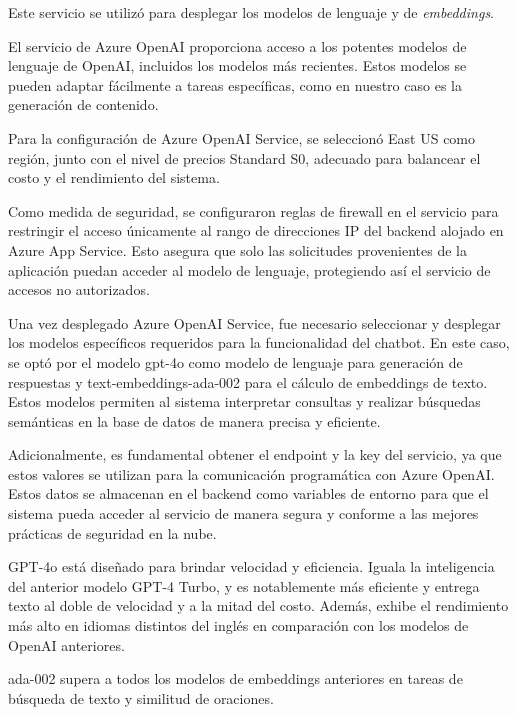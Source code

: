 Este servicio se utilizó para desplegar los modelos de lenguaje y de \textit{embeddings}.

El servicio de Azure OpenAI proporciona acceso a los potentes modelos de lenguaje de OpenAI, incluidos los modelos más recientes. Estos modelos se pueden adaptar fácilmente a tareas específicas, como en nuestro caso es la generación de contenido.

Para la configuración de Azure OpenAI Service, se seleccionó East US como región, junto con el nivel de precios Standard S0, adecuado para balancear el costo y el rendimiento del sistema.

Como medida de seguridad, se configuraron reglas de firewall en el servicio para restringir el acceso únicamente al rango de direcciones IP del backend alojado en Azure App Service. Esto asegura que solo las solicitudes provenientes de la aplicación puedan acceder al modelo de lenguaje, protegiendo así el servicio de accesos no autorizados.

Una vez desplegado Azure OpenAI Service, fue necesario seleccionar y desplegar los modelos específicos requeridos para la funcionalidad del chatbot. En este caso, se optó por el modelo gpt-4o como modelo de lenguaje para generación de respuestas y text-embeddings-ada-002 para el cálculo de embeddings de texto. Estos modelos permiten al sistema interpretar consultas y realizar búsquedas semánticas en la base de datos de manera precisa y eficiente.

Adicionalmente, es fundamental obtener el endpoint y la key del servicio, ya que estos valores se utilizan para la comunicación programática con Azure OpenAI. Estos datos se almacenan en el backend como variables de entorno para que el sistema pueda acceder al servicio de manera segura y conforme a las mejores prácticas de seguridad en la nube.

GPT-4o está diseñado para brindar velocidad y eficiencia. Iguala la inteligencia del anterior modelo GPT-4 Turbo, y es notablemente más eficiente y entrega texto al doble de velocidad y a la mitad del costo. Además, exhibe el rendimiento más alto en idiomas distintos del inglés en comparación con los modelos de OpenAI anteriores.

ada-002 supera a todos los modelos de embeddings anteriores en tareas de búsqueda de texto y similitud de oraciones.

